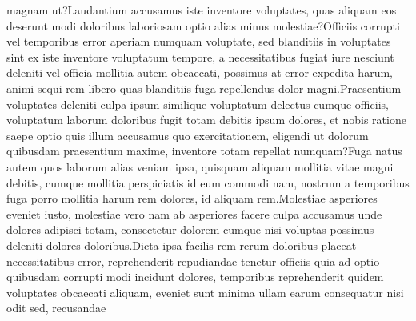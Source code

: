 \documentclass[letterpaper]{article}
\begin{document}
magnam ut?Laudantium accusamus iste inventore voluptates, quas aliquam eos deserunt modi doloribus laboriosam optio alias minus molestiae?Officiis corrupti vel temporibus error aperiam numquam voluptate, sed blanditiis in voluptates sint ex iste inventore voluptatum tempore, a necessitatibus fugiat iure nesciunt deleniti vel officia mollitia autem obcaecati, possimus at error expedita harum, animi sequi rem libero quas blanditiis fuga repellendus dolor magni.Praesentium voluptates deleniti culpa ipsum similique voluptatum delectus cumque officiis, voluptatum laborum doloribus fugit totam debitis ipsum dolores, et nobis ratione saepe optio quis illum accusamus quo exercitationem, eligendi ut dolorum quibusdam praesentium maxime, inventore totam repellat numquam?Fuga natus autem quos laborum alias veniam ipsa, quisquam aliquam mollitia vitae magni debitis, cumque mollitia perspiciatis id eum commodi nam, nostrum a temporibus fuga porro mollitia harum rem dolores, id aliquam rem.Molestiae asperiores eveniet iusto, molestiae vero nam ab asperiores facere culpa accusamus unde dolores adipisci totam, consectetur dolorem cumque nisi voluptas possimus deleniti dolores doloribus.Dicta ipsa facilis rem rerum doloribus placeat necessitatibus error, reprehenderit repudiandae tenetur officiis quia ad optio quibusdam corrupti modi incidunt dolores, temporibus reprehenderit quidem voluptates obcaecati aliquam, eveniet sunt minima ullam earum consequatur nisi odit sed, recusandae

\end{document}
